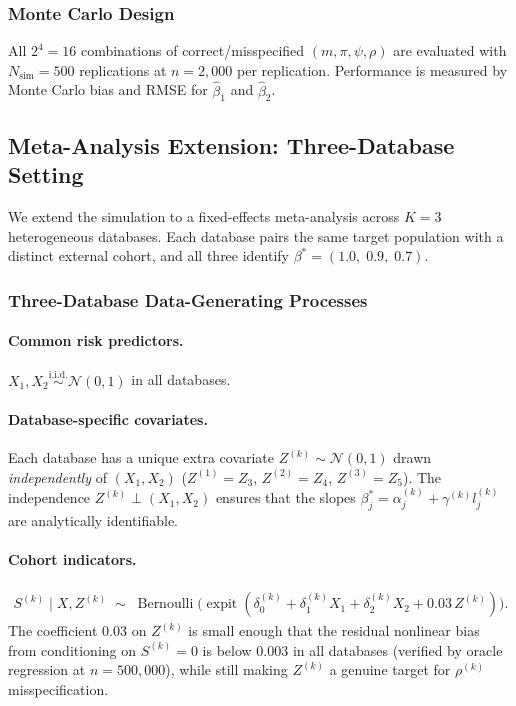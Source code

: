 \subsubsection*{Monte Carlo Design}

All $2^4 = 16$ combinations of correct/misspecified $(m, \pi, \psi, \rho)$
are evaluated with $N_{\mathrm{sim}} = 500$ replications at $n = 2{,}000$
per replication.  Performance is measured by Monte Carlo bias and RMSE for
$\hat\beta_1$ and $\hat\beta_2$.

\subsection*{Meta-Analysis Extension: Three-Database Setting}

We extend the simulation to a fixed-effects meta-analysis across $K = 3$
heterogeneous databases.  Each database pairs the same target population with
a distinct external cohort, and all three identify $\beta^* = (1.0,\;0.9,\;0.7)$.

\subsubsection*{Three-Database Data-Generating Processes}

\paragraph{Common risk predictors.}
$X_1, X_2 \overset{\text{i.i.d.}}{\sim} \mathcal{N}(0,1)$ in all databases.

\paragraph{Database-specific covariates.}
Each database has a unique extra covariate $Z^{(k)} \sim \mathcal{N}(0,1)$
drawn \emph{independently} of $(X_1,X_2)$
($Z^{(1)} = Z_3$, $Z^{(2)} = Z_4$, $Z^{(3)} = Z_5$).
The independence $Z^{(k)} \perp (X_1,X_2)$ ensures that the slopes
$\beta_j^* = \alpha_j^{(k)} + \gamma^{(k)} l_j^{(k)}$
are analytically identifiable.

\paragraph{Cohort indicators.}
\begin{align}
  S^{(k)} \mid X, Z^{(k)} \;\sim\;
  \operatorname{Bernoulli}\!\bigl(
    \operatorname{expit}(\delta_0^{(k)} + \delta_1^{(k)} X_1
    + \delta_2^{(k)} X_2 + 0.03\,Z^{(k)})\bigr).
\end{align}
The coefficient $0.03$ on $Z^{(k)}$ is small enough that the residual
nonlinear bias from conditioning on $S^{(k)}=0$ is below $0.003$ in
all databases (verified by oracle regression at $n = 500{,}000$), while
still making $Z^{(k)}$ a genuine target for $\rho^{(k)}$ misspecification.

